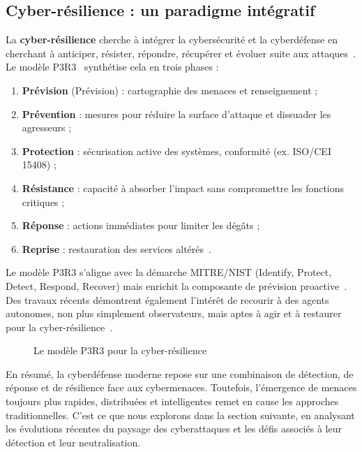 \documentclass[ twoside,openright,titlepage,numbers=noenddot,headinclude,%
                footinclude=true,cleardoublepage=empty,abstractoff, %
                BCOR=5mm,paper=a4,fontsize=11pt,%
                french,american,%
                ]{scrreprt}
\begin{document}
\subsection*{Cyber-résilience : un paradigme intégratif}

La \textbf{cyber-résilience} cherche à intégrer la cybersécurité et la cyberdéfense en cherchant à anticiper, résister, répondre, récupérer et évoluer suite aux attaques~\cite{NISTresilience}. Le modèle P3R3~\cite{Theron2013P3R3} synthétise cela en trois phases :

\begin{enumerate}
    \item \textbf{Prévision} (Prévision) : cartographie des menaces et renseignement ;
    \item \textbf{Prévention} : mesures pour réduire la surface d'attaque et dissuader les agresseurs ;
    \item \textbf{Protection} : sécurisation active des systèmes, conformité (ex. ISO/CEI 15408) ;
    \item \textbf{Résistance} : capacité à absorber l'impact sans compromettre les fonctions critiques ;
    \item \textbf{Réponse} : actions immédiates pour limiter les dégâts ;
    \item \textbf{Reprise} : restauration des services altérés~\cite{Theron2013P3R3}.
\end{enumerate}

Le modèle P3R3 s'aligne avec la démarche MITRE/NIST (Identify, Protect, Detect, Respond, Recover) mais enrichit la composante de prévision proactive~\cite{Theron2013P3R3}.
Des travaux récents démontrent également l'intérêt de recourir à des agents autonomes, non plus simplement observateurs, mais aptes à agir et à restaurer pour la cyber-résilience~\cite{Kott2023}.

\begin{figure}[h]
    \centering
    \caption{Le modèle P3R3 pour la cyber-résilience}
    \label{fig:P3R3_model}
\end{figure}

\noindent
En résumé, la cyberdéfense moderne repose sur une combinaison de détection, de réponse et de résilience face aux cybermenaces. Toutefois, l'émergence de menaces toujours plus rapides, distribuées et intelligentes remet en cause les approches traditionnelles. C'est ce que nous explorons dans la section suivante, en analysant les évolutions récentes du paysage des cyberattaques et les défis associés à leur détection et leur neutralisation.
\end{document}
